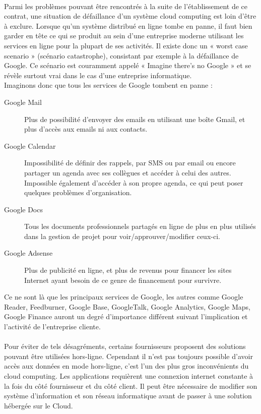 \documentclass[a4paper,12pt]{report}
\begin{document}
\begin{onehalfspace}
	\paragraph*{}
	Parmi les problèmes pouvant être rencontrés à la suite de l’établissement de ce contrat, une situation de défaillance d'un système cloud computing est loin d’être à exclure. Lorsque qu'un système distribué en ligne tombe en panne, il faut bien garder en tête ce qui se produit au sein d'une entreprise moderne utilisant les services en ligne pour la plupart de ses activités. Il existe donc un « worst case scenario » (scénario catastrophe), consistant par exemple à la défaillance de Google. Ce scénario est couramment appelé « Imagine there's no Google » et se révèle surtout vrai dans le cas d'une entreprise informatique.\\
Imaginons donc que tous les services de Google tombent en panne :
\begin{description}
	\item[Google Mail]
Plus de possibilité d'envoyer des emails en utilisant une boîte Gmail, et plus d'accès aux emails ni aux contacts.
	\item[Google Calendar]
Impossibilité de définir des rappels, par SMS ou par email ou encore partager un agenda avec ses collègues et accéder à celui des autres. Impossible également d'accéder à son propre agenda, ce qui peut poser quelques problèmes d’organisation.
	\item[Google Docs]
Tous les documents professionnels partagés en ligne de plus en plus utilisés dans la gestion de projet pour voir/approuver/modifier ceux-ci.
	\item[Google Adsense]
Plus de publicité en ligne, et plus de revenus pour financer les sites Internet ayant besoin de ce genre de financement pour survivre.
\end{description}
Ce ne sont là que les principaux services de Google, les autres comme Google Reader, Feedburner, Google Base, GoogleTalk, Google Analytics, Google Maps, Google Finance auront un degré d’importance différent suivant l’implication et l’activité de l’entreprise cliente.

	\paragraph*{}
	Pour éviter de tels désagréments, certains fournisseurs proposent des solutions pouvant être utilisées hors-ligne. Cependant il n’est pas toujours possible d’avoir accès aux données en mode hors-ligne, c’est l’un des plus gros inconvénients du cloud computing. Les applications requièrent une connexion internet constante à la fois du côté fournisseur et du côté client. Il peut être nécessaire de modifier son système d’information et son réseau informatique avant de passer à une solution hébergée sur le Cloud.
		 

\end{onehalfspace}
\end{document}
